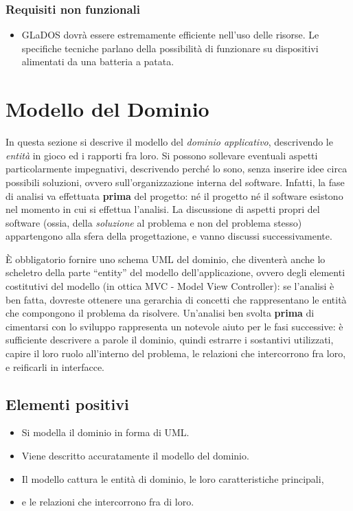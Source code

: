\documentclass[a4paper,12pt]{report}
\begin{document}
\subsubsection{Requisiti non funzionali}
\begin{itemize}
	\item GLaDOS dovrà essere estremamente efficiente nell'uso delle risorse. Le specifiche tecniche parlano della possibilità di funzionare su dispositivi alimentati da una batteria a patata.
\end{itemize}


\section{Modello del Dominio}

In questa sezione si descrive il modello del \textit{dominio
applicativo}, descrivendo le \textit{entità} in gioco ed i rapporti fra loro.
%
Si possono sollevare eventuali aspetti particolarmente impegnativi, descrivendo perché lo sono, senza inserire idee circa possibili soluzioni, ovvero sull'organizzazione interna del software.
%
Infatti, la fase di analisi va effettuata \textbf{prima} del progetto: né il progetto né il software esistono nel momento in cui si effettua l'analisi.
%
La discussione di aspetti propri del software (ossia, della \textit{soluzione} al problema e non del problema stesso) appartengono alla sfera della progettazione, e vanno discussi successivamente.

È obbligatorio fornire uno schema UML del dominio, che diventerà anche lo scheletro della
parte ``entity'' del modello dell'applicazione, ovvero degli elementi costitutivi del modello (in ottica MVC - Model View Controller): se l'analisi è ben fatta, dovreste ottenere una gerarchia di concetti che rappresentano le entità che compongono il problema da risolvere.
%
Un'analisi ben svolta \textbf{prima} di cimentarsi con lo sviluppo rappresenta un notevole aiuto per
le fasi successive: è sufficiente descrivere a parole il dominio, quindi estrarre i sostantivi
utilizzati, capire il loro ruolo all'interno del problema, le relazioni che intercorrono fra loro, e
reificarli in interfacce.

\subsection*{Elementi positivi}
\begin{itemize}
	\item Si modella il dominio in forma di UML\@.
	\item Viene descritto accuratamente il modello del dominio.
	\item Il modello cattura le entità di dominio, le loro caratteristiche principali,
	\item e le relazioni che intercorrono fra di loro.
\end{itemize}
\end{document}
